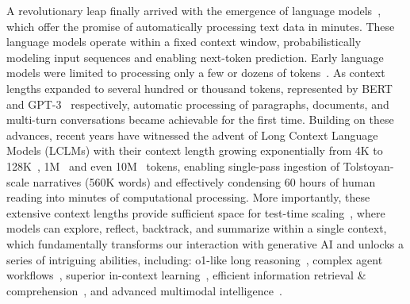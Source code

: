 \documentclass[11pt, a4paper, logo, copyright, nonumbering]{map}
\begin{document}
A revolutionary leap finally arrived with the emergence of language models~\citep{wang2023rolellm, Zhang2025CodeCriticBenchAH,mceval,mdeval,tablebench,supergpqa,sailor2report,zhang2024mapneo,Huang2024OpenCoderTO,liu-etal-2024-e2,codearena,execrepobench}, which offer the promise of automatically processing text data in minutes. These language models operate within a fixed context window, probabilistically modeling input sequences and enabling next-token prediction. Early language models were limited to processing only a few or dozens of tokens~\citep{shannon1948mathematical,brants2007large,chen1999empirical,mikolov2010recurrent}. As context lengths expanded to several hundred or thousand tokens, represented by BERT~\citep{devlin-etal-2019-bert} and GPT-3~\citep{10.5555/3495724.3495883} respectively, automatic processing of paragraphs, documents, and multi-turn conversations became achievable for the first time. Building on these advances, recent years have witnessed the advent of Long Context Language Models (LCLMs) with their context length growing exponentially from 4K to 128K~\citep{grattafiori2024llama}, 1M~\citep{yang2025qwen2} and even 10M~\citep{team2024gemini} tokens, enabling single-pass ingestion of Tolstoyan-scale narratives (560K words) and effectively condensing 60 hours of human reading into minutes of computational processing. More importantly, these extensive context lengths provide sufficient space for test-time scaling~\citep{openai_o1_2024,guo2025deepseek}, where models can explore, reflect, backtrack, and summarize within a single context, which fundamentally transforms our interaction with generative AI and unlocks a series of intriguing abilities, including: o1-like long reasoning~\citep{guo2025deepseek,openai_o1_2024,muennighoff2025s1}, complex agent workflows~\citep{oai2025deepresearch}, superior in-context learning~\citep{minimax2025minimax01scalingfoundationmodels,team2024gemini}, efficient information retrieval \& comprehension~\citep{wang2024large,lee2024can}, and advanced multimodal intelligence~\citep{Qwen2.5-VL,weng2024longvlm}.





















    
\end{document}
